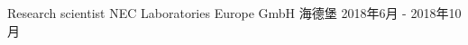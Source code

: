 \cventry
{Research scientist} %
{NEC Laboratories Europe GmbH} %
{海德堡} %
{2018年6月 - 2018年10月} %
{ %
}
